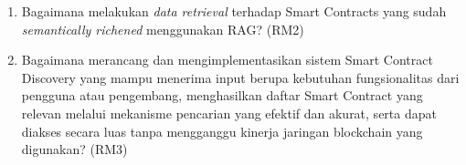 \begin{enumerate}
  \item Bagaimana melakukan \textit{data retrieval} terhadap Smart Contracts yang sudah \textit{semantically richened} menggunakan RAG? (RM2)

  \item Bagaimana merancang dan mengimplementasikan sistem Smart Contract Discovery yang mampu menerima input berupa kebutuhan fungsionalitas dari pengguna atau pengembang, menghasilkan daftar Smart Contract yang relevan melalui mekanisme pencarian yang efektif dan akurat, serta dapat diakses secara luas tanpa mengganggu kinerja jaringan blockchain yang digunakan? (RM3)

  

\end{enumerate}



